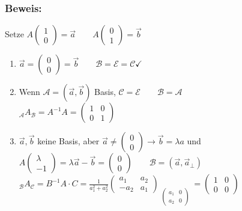 \subsubsection{Beweis:}
Setze $A\begin{pmatrix} 1 \\ 0 \end{pmatrix} = \vec{a} \qquad A \begin{pmatrix} 0 \\ 1 \end{pmatrix} = \vec{b}$
\begin{enumerate}
	\item $\vec{a} = \begin{pmatrix} 0 \\ 0 \end{pmatrix} = \vec{b} \qquad \mathcal{B} = 
		\mathcal{E} = \mathcal{C} \checkmark$
	\item Wenn $\mathcal{A} = (\vec{a},\vec{b})$ Basis, $\mathcal{C}=\mathcal{E} \qquad 
		\mathcal{B}  = \mathcal{A}$ \\ 
		$_{\mathcal{A}}A_{\mathcal{B}}=A^{-1}A=\begin{pmatrix} 1 & 0 \\ 0 & 1 
		\end{pmatrix}$
	\item $\vec{a}, \vec{b}$ keine Basis, aber $\vec{a} \neq \begin{pmatrix} 0 \\ 0 
		\end{pmatrix} \rightarrow \vec{b} = \lambda a$ und $A\begin{pmatrix}\lambda	
		\\ -1\end{pmatrix} = \lambda \vec{a} - \vec{b} = \begin{pmatrix} 0 \\ 0 
		\end{pmatrix} \qquad \mathcal{B} = (\vec{a},\vec{a}_{\perp})$\\
		$_{\mathcal{B}}A_{\mathcal{C}} = B^{-1}A\cdot C = \frac{1}{a_{1}^{2}+a_{2}^{2}} 
		\begin{pmatrix} a_{1} & a_{2} \\ -a_{2} & a_{1} \end{pmatrix} 
		\mathop{\underbrace{\begin{pmatrix} a_{1} & b_{1} \\ a_{2} & b_{2} 
		\end{pmatrix} \begin{pmatrix} 1 & \lambda \\ 0 & -1 
		\end{pmatrix}}}\limits_{\begin{pmatrix} a_{1} & 0 \\ a_{2} & 0 
		\end{pmatrix}}=\begin{pmatrix} 1 & 0 \\ 0 & 0 \end{pmatrix}$
\end{enumerate}
